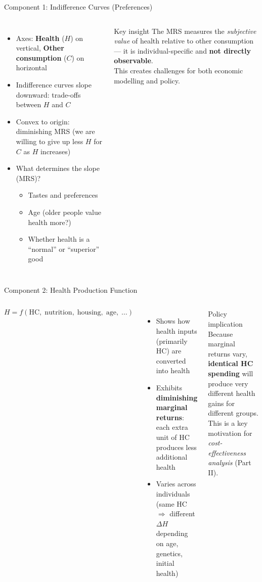 \documentclass[aspectratio=169, 12pt]{beamer}
\begin{document}
\begin{frame}{Component 1: Indifference Curves (Preferences)}
  \begin{columns}
      \begin{itemize}
        \item Axes: \textbf{Health} ($H$) on vertical, \textbf{Other consumption} ($C$) on horizontal
        \item Indifference curves slope downward: trade-offs between $H$ and $C$
        \item Convex to origin: diminishing MRS (we are willing to give up less $H$ for $C$
              as $H$ increases)
        \item What determines the slope (MRS)?
        \begin{itemize}
          \item Tastes and preferences
          \item Age (older people value health more?)
          \item Whether health is a ``normal'' or ``superior'' good
        \end{itemize}
      \end{itemize}
      \begin{block}{Key insight}
        The MRS measures the \emph{subjective value} of health relative to other consumption ---
        it is individual-specific and \textbf{not directly observable}.\\[0.3em]
        This creates challenges for both economic modelling and policy.
      \end{block}
  \end{columns}
\end{frame}

\begin{frame}{Component 2: Health Production Function}
  \begin{columns}
      $$H = f(\text{HC},\; \text{nutrition},\; \text{housing},\; \text{age},\; \ldots)$$
      \begin{itemize}
        \item Shows how health inputs (primarily HC) are converted into health
        \item Exhibits \textbf{diminishing marginal returns}: each extra unit of HC produces
              less additional health
        \item Varies across individuals (same HC $\Rightarrow$ different $\Delta H$ depending on
              age, genetics, initial health)
      \end{itemize}
      \begin{alertblock}{Policy implication}
        Because marginal returns vary, \textbf{identical HC spending} will produce very
        different health gains for different groups.\\[0.3em]
        This is a key motivation for \emph{cost-effectiveness analysis} (Part II).
      \end{alertblock}
  \end{columns}
\end{frame}
\end{document}
